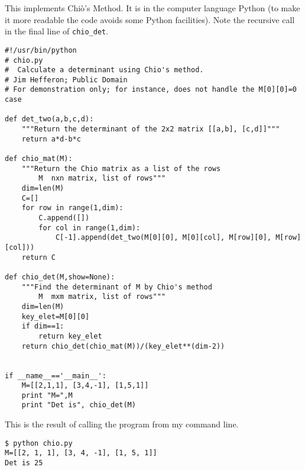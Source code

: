 \announcecomputercode
This implements Chi\`o's Method.
It is in the computer language Python (to make it more readable 
the code avoids some Python facilities).
Note the recursive call in the final line of 
\lstinline!chio_det!. 
\begin{lstlisting}
#!/usr/bin/python
# chio.py
#  Calculate a determinant using Chio's method.
# Jim Hefferon; Public Domain
# For demonstration only; for instance, does not handle the M[0][0]=0 case

def det_two(a,b,c,d):
    """Return the determinant of the 2x2 matrix [[a,b], [c,d]]"""
    return a*d-b*c

def chio_mat(M):
    """Return the Chio matrix as a list of the rows
        M  nxn matrix, list of rows"""
    dim=len(M)
    C=[]
    for row in range(1,dim):
        C.append([])
        for col in range(1,dim):  
            C[-1].append(det_two(M[0][0], M[0][col], M[row][0], M[row][col]))
    return C

def chio_det(M,show=None):
    """Find the determinant of M by Chio's method
        M  mxm matrix, list of rows"""
    dim=len(M)
    key_elet=M[0][0]
    if dim==1:
        return key_elet
    return chio_det(chio_mat(M))/(key_elet**(dim-2))


if __name__=='__main__':
    M=[[2,1,1], [3,4,-1], [1,5,1]]
    print "M=",M
    print "Det is", chio_det(M)
\end{lstlisting}
This is the result of calling the program from my command line.
\begin{lstlisting}
$ python chio.py
M=[[2, 1, 1], [3, 4, -1], [1, 5, 1]]
Det is 25
\end{lstlisting}
\endinput
